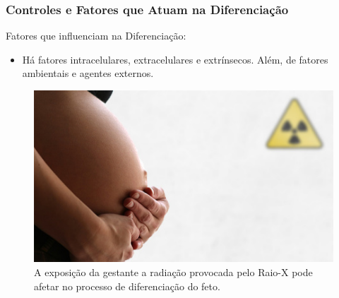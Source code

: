 \documentclass[brazil]{beamer}
\begin{document}
\begin{frame}
  \frametitle{Controles e Fatores que Atuam na Diferenciação}
  \raggedright
    \begin{block}{Fatores que influenciam na Diferenciação:}
    \footnotesize 
	\begin{itemize}
	  \item Há fatores intracelulares, extracelulares e extrínsecos. Além, de fatores ambientais e agentes externos.
	\end{itemize}
    \end{block}
    \pause
    
    \begin{figure}
      \includegraphics[scale=0.46]{gravidez_radiacao.jpg}
      \caption{\tiny A exposição da gestante a radiação provocada pelo Raio-X pode afetar no processo de diferenciação do feto.}
    \end{figure}    
\end{frame}
\end{document}
